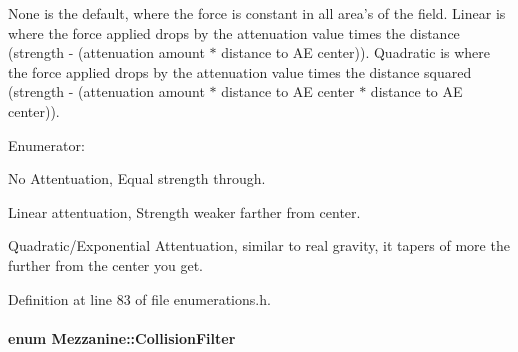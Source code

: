 None is the default, where the force is constant in all area's of the field. Linear is where the force applied drops by the attenuation value times the distance (strength -\/ (attenuation amount $\ast$ distance to AE center)). Quadratic is where the force applied drops by the attenuation value times the distance squared (strength -\/ (attenuation amount $\ast$ distance to AE center $\ast$ distance to AE center)). \begin{Desc}
\item[Enumerator: ]\par
\begin{description}
\item[{\em 
\hypertarget{namespaceMezzanine_a2d10a79e11a2031df10af540eede12faa548ff9c1d108b12ea6323d39c41856f5}{
Att\_\-None}
\label{namespaceMezzanine_a2d10a79e11a2031df10af540eede12faa548ff9c1d108b12ea6323d39c41856f5}
}]No Attentuation, Equal strength through. \item[{\em 
\hypertarget{namespaceMezzanine_a2d10a79e11a2031df10af540eede12faaaecc4b0547a61e5b2abd5401182c9470}{
Att\_\-Linear}
\label{namespaceMezzanine_a2d10a79e11a2031df10af540eede12faaaecc4b0547a61e5b2abd5401182c9470}
}]Linear attentuation, Strength weaker farther from center. \item[{\em 
\hypertarget{namespaceMezzanine_a2d10a79e11a2031df10af540eede12faa7f0c2854461a843af7eb21c036375e83}{
Att\_\-Quadratic}
\label{namespaceMezzanine_a2d10a79e11a2031df10af540eede12faa7f0c2854461a843af7eb21c036375e83}
}]Quadratic/Exponential Attentuation, similar to real gravity, it tapers of more the further from the center you get. \end{description}
\end{Desc}



Definition at line 83 of file enumerations.h.

\hypertarget{namespaceMezzanine_a475283a31c5df11f18e059953f32ace2}{
\paragraph[{CollisionFilter}]{\setlength{\rightskip}{0pt plus 5cm}enum {\bf Mezzanine::CollisionFilter}}\hfill}
\label{namespaceMezzanine_a475283a31c5df11f18e059953f32ace2}


